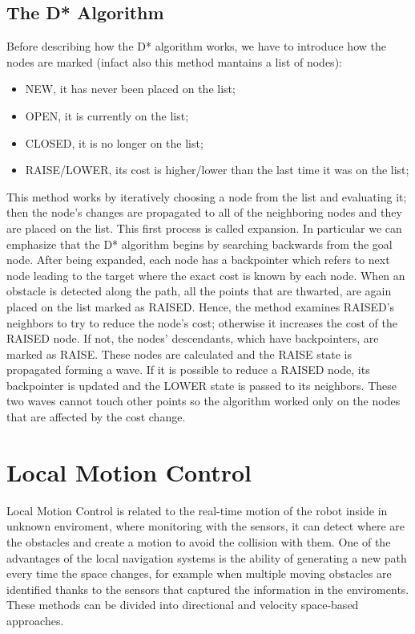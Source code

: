 \subsection{The D* Algorithm}
Before describing how the D* algorithm works, we have to introduce how the nodes are marked (infact also this method mantains a list of nodes):
\begin{itemize}
	\item NEW, it has never been placed on the list;
	\item OPEN, it is currently on the list;
	\item CLOSED, it is no longer on the list;
	\item RAISE/LOWER, its cost is higher/lower than the last time it was on the list;
\end{itemize}

This method works by iteratively choosing a node from the list and evaluating it; then the node's changes are propagated to all of the neighboring nodes and they are placed on the list. This first process is called expansion. In particular we can emphasize that the D* algorithm begins by searching backwards from the goal node. After being expanded, each node has a backpointer which refers to next node leading to the target where the exact cost is known by each node.
When an obstacle is detected along the path, all the points that are thwarted, are again placed on the list marked as RAISED. Hence, the method examines RAISED's neighbors to try to reduce the node's cost; otherwise it increases the cost of the RAISED node. If not, the nodes' descendants, which have backpointers, are marked as RAISE. These nodes are calculated and the RAISE state is propagated forming a wave. If it is possible to reduce a RAISED node, its backpointer is updated and the LOWER state is passed to its neighbors. These two waves cannot touch other points so the algorithm worked only on the nodes that are affected by the cost change.

\section{Local Motion Control}
Local Motion Control is related to the real-time motion of the robot inside in unknown enviroment, where monitoring with the sensors, it can detect where are the obstacles and create a motion to avoid the collision with them. One of the advantages of the local navigation systems is the ability of generating a new path every time the space changes, for example when multiple moving obstacles are identified thanks to the sensors that captured the information in the enviroments. These methods can be divided into directional and velocity space-based approaches.


